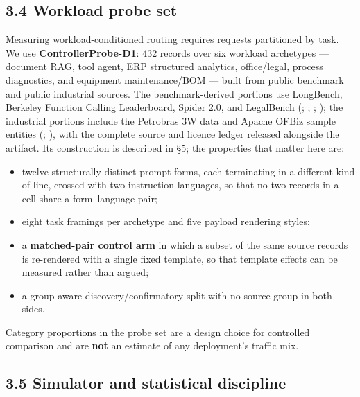 \documentclass[
  10pt,
  letterpaper,
  10pt]{article}
\providecommand{\tightlist}{%
  \setlength{\itemsep}{0pt}\setlength{\parskip}{0pt}}
\begin{document}
\subsection{3.4 Workload probe set}\label{workload-probe-set}

Measuring workload-conditioned routing requires requests partitioned by
task. We use \textbf{ControllerProbe-D1}: 432 records over six workload
archetypes --- document RAG, tool agent, ERP structured analytics,
office/legal, process diagnostics, and equipment maintenance/BOM ---
built from public benchmark and public industrial sources. The
benchmark-derived portions use LongBench, Berkeley Function Calling
Leaderboard, Spider 2.0, and LegalBench
(;
;
;
); the industrial
portions include the Petrobras 3W data and Apache OFBiz sample entities
(;
), with
the complete source and licence ledger released alongside the artifact.
Its construction is described in §5; the properties that matter here
are:

\begin{itemize}
\tightlist
\item
  twelve structurally distinct prompt forms, each terminating in a
  different kind of line, crossed with two instruction languages, so
  that no two records in a cell share a form--language pair;
\item
  eight task framings per archetype and five payload rendering styles;
\item
  a \textbf{matched-pair control arm} in which a subset of the same
  source records is re-rendered with a single fixed template, so that
  template effects can be measured rather than argued;
\item
  a group-aware discovery/confirmatory split with no source group in
  both sides.
\end{itemize}

Category proportions in the probe set are a design choice for controlled
comparison and are \textbf{not} an estimate of any deployment's traffic
mix.

\subsection{3.5 Simulator and statistical
discipline}\label{simulator-and-statistical-discipline}
\end{document}
